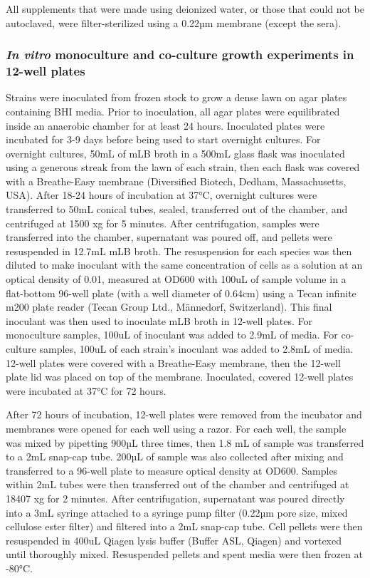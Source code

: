 \documentclass[11pt,twocolumn,notitlepage,openany,twoside]{book}
\begin{document}
\begin{refsection}
All supplements that were made using deionized water, or those that could not be autoclaved, were filter-sterilized using a 0.22µm membrane (except the sera).

\subsubsection{\textit{In vitro} monoculture and co-culture growth experiments in 12-well plates}

Strains were inoculated from frozen stock to grow a dense lawn on agar plates containing BHI media. Prior to inoculation, all agar plates were equilibrated inside an anaerobic chamber for at least 24 hours. Inoculated plates were incubated for 3-9 days before being used to start overnight cultures. For overnight cultures, 50mL of mLB broth in a 500mL glass flask was inoculated using a generous streak from the lawn of each strain, then each flask was covered with a Breathe-Easy membrane (Diversified Biotech, Dedham, Massachusetts, USA). After 18-24 hours of incubation at 37°C, overnight cultures were transferred to 50mL conical tubes, sealed, transferred out of the chamber, and centrifuged at 1500 xg for 5 minutes. After centrifugation, samples were transferred into the chamber, supernatant was poured off, and pellets were resuspended in 12.7mL mLB broth. The resuspension for each species was then diluted to make inoculant with the same concentration of cells as a solution at an optical density of 0.01, measured at OD600 with 100uL of sample volume in a flat-bottom 96-well plate (with a well diameter of 0.64cm) using a Tecan infinite m200 plate reader (Tecan Group Ltd., Männedorf, Switzerland). This final inoculant was then used to inoculate mLB broth in 12-well plates. For monoculture samples, 100uL of inoculant was added to 2.9mL of media. For co-culture samples, 100uL of each strain’s inoculant was added to 2.8mL of media. 12-well plates were covered with a Breathe-Easy membrane, then the 12-well plate lid was placed on top of the membrane. Inoculated, covered 12-well plates were incubated at 37°C for 72 hours.

After 72 hours of incubation, 12-well plates were removed from the incubator and membranes were opened for each well using a razor. For each well, the sample was mixed by pipetting 900µL three times, then 1.8 mL of sample was transferred to a 2mL snap-cap tube. 200µL of sample was also collected after mixing and transferred to a 96-well plate to measure optical density at OD600. Samples within 2mL tubes were then transferred out of the chamber and centrifuged at 18407 xg for 2 minutes. After centrifugation, supernatant was poured directly into a 3mL syringe attached to a syringe pump filter (0.22µm pore size, mixed cellulose ester filter) and filtered into a 2mL snap-cap tube. Cell pellets were then resuspended in 400uL Qiagen lysis buffer (Buffer ASL, Qiagen) and vortexed until thoroughly mixed. Resuspended pellets and spent media were then frozen at -80°C.


\end{refsection}
\end{document}
